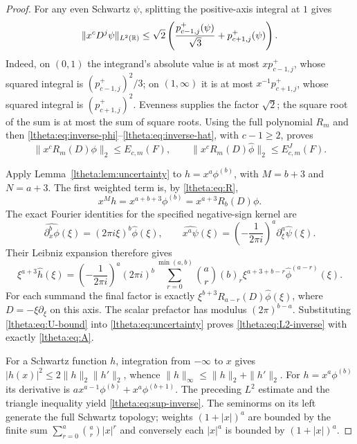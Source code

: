 \documentclass[11pt]{article}
\begin{document}
\begin{proof}
For any even Schwartz $\psi$, splitting the positive-axis integral at
$1$ gives
\[
 \|x^cD^j\psi\|_{L^2(\mathbb R)}
 \leq\sqrt2\left(\frac{p^+_{c-1,j}(\psi)}{\sqrt3}
                               +p^+_{c+1,j}(\psi)\right).
\]
Indeed, on $(0,1)$ the integrand's absolute value is at most
$xp^+_{c-1,j}$, whose squared integral is $(p^+_{c-1,j})^2/3$;
on $(1,\infty)$ it is at most $x^{-1}p^+_{c+1,j}$, whose squared
integral is $(p^+_{c+1,j})^2$. Evenness supplies the factor $\sqrt2$;
the square root of the sum is at most the sum of square roots.
Using the full polynomial $R_m$ and then
\eqref{ltheta:eq:inverse-phi}--\eqref{ltheta:eq:inverse-hat}, with $c-1\geq2$, proves
\begin{equation}\label{ltheta:eq:U-bound}
 \|x^cR_m(D)\phi\|_2\leq E_{c,m}(F),\qquad
 \|x^cR_m(D)\widehat\phi\|_2\leq E^J_{c,m}(F).
\end{equation}

Apply Lemma~\ref{ltheta:lem:uncertainty} to
$h=x^a\phi^{(b)}$, with $M=b+3$ and $N=a+3$. The first weighted
term is, by \eqref{ltheta:eq:R},
\[
 x^Mh=x^{a+b+3}\phi^{(b)}=x^{a+3}R_b(D)\phi.
\]
The exact Fourier identities for the specified negative-sign kernel are
\[
 \widehat{\partial_x^b\phi}(\xi)=(2\pi i\xi)^b\widehat\phi(\xi),
 \qquad
 \widehat{x^a\psi}(\xi)=\left(-\frac1{2\pi i}\right)^a
                                      \partial_\xi^a\widehat\psi(\xi).
\]
Their Leibniz expansion therefore gives
\[
 \xi^{a+3}\widehat h(\xi)
 =\left(-\frac1{2\pi i}\right)^a(2\pi i)^b
 \sum_{r=0}^{\min(a,b)}\binom ar(b)_r
       \xi^{a+3+b-r}\widehat\phi^{(a-r)}(\xi).
\]
For each summand the final factor is exactly
$\xi^{b+3}R_{a-r}(D)\widehat\phi(\xi)$, where
$D=-\xi\partial_\xi$ on this axis. The scalar prefactor has modulus
$(2\pi)^{b-a}$. Substituting \eqref{ltheta:eq:U-bound} into
\eqref{ltheta:eq:uncertainty} proves \eqref{ltheta:eq:L2-inverse} with exactly
\eqref{ltheta:eq:A}.

For a Schwartz function $h$, integration from $-\infty$ to $x$ gives
$|h(x)|^2\leq2\|h\|_2\|h'\|_2$, whence
$\|h\|_\infty\leq\|h\|_2+\|h'\|_2$.
For $h=x^a\phi^{(b)}$ its derivative is
$a x^{a-1}\phi^{(b)}+x^a\phi^{(b+1)}$. The preceding $L^2$ estimate
and the triangle inequality yield \eqref{ltheta:eq:sup-inverse}. The
seminorms on its left generate the full Schwartz topology; weights
$(1+|x|)^a$ are bounded by the finite sum
$\sum_{r=0}^a\binom ar|x|^r$ and conversely each $|x|^a$ is bounded by
$(1+|x|)^a$.
\end{proof}
\end{document}
